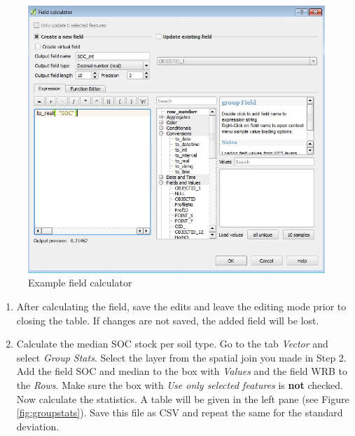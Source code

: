 \documentclass[10pt,b5paper,]{book}
\providecommand{\tightlist}{%
  \setlength{\itemsep}{0pt}\setlength{\parskip}{0pt}}
\theoremstyle{definition}
\theoremstyle{definition}
\theoremstyle{definition}
\theoremstyle{remark}
\begin{document}
\begin{figure}

{\centering \includegraphics[width=0.8\linewidth]{images/Conv_upscaling5} 

}

\caption{Example field calculator}\label{fig:fieldcalc}
\end{figure}

\begin{enumerate}
\def\labelenumi{\arabic{enumi}.}
\setcounter{enumi}{4}
\tightlist
\item
  After calculating the field, save the edits and leave the editing mode
  prior to closing the table. If changes are not saved, the added field
  will be lost.
\item
  Calculate the median SOC stock per soil type. Go to the tab
  \emph{Vector} and select \emph{Group Stats}. Select the layer from the
  spatial join you made in Step 2. Add the field SOC and median to the
  box with \emph{Values} and the field WRB to the \emph{Rows}. Make sure
  the box with \emph{Use only selected features} is \textbf{not}
  checked. Now calculate the statistics. A table will be given in the
  left pane (see Figure \ref{fig:groupstats}). Save this file as CSV and
  repeat the same for the standard deviation.
\end{enumerate}
\end{document}
